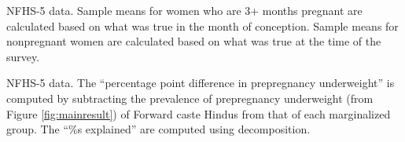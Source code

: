 \documentclass[12pt]{article}
\begin{document}
\begin{landscape}

\begin{table}[!htbp]
    \centering
    \begin{threeparttable}[t]
        \caption{:  Descriptive statistics by social group and pregnancy status}
        \label{tab:sumstats}

        \scriptsize
        \setlength{\tabcolsep}{2pt}
        \renewcommand{\arraystretch}{1.2}

        

        \begin{tablenotes}
            \item NFHS-5 data. Sample means for women who are 3+ months pregnant are calculated based on what was true in the month of conception. Sample means for nonpregnant women are calculated based on what was true at the time of the survey.
        \end{tablenotes}
    \end{threeparttable}
\end{table}
\end{landscape}

\begin{landscape}

\begin{table}[H]
    \centering

    \begin{threeparttable}
        
    
    \small %
    \caption{: Decomposition of social group differences in the prevalence of prepregnancy underweight}
    \label{decomposition}
    \renewcommand{\arraystretch}{1.5}
    {}

    \begin{tablenotes}
        \item NFHS-5 data.  The ``percentage point difference in prepregnancy underweight'' is computed by subtracting the prevalence of prepregnancy underweight (from Figure \ref{fig:mainresult}) of Forward caste Hindus from that of each marginalized group. The ``\%s explained'' are computed using \cite{kitagawa1955components} decomposition. 
    \end{tablenotes}

    \end{threeparttable}
\end{table}

\end{landscape}
\end{document}
